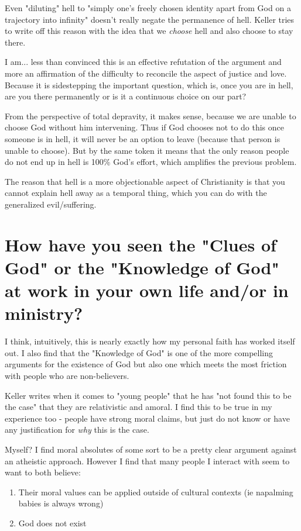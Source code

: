 \documentclass[12pt]{turabian-researchpaper}
\begin{document}
Even "diluting" hell to "simply one's freely chosen identity apart from God on a trajectory into infinity"\autocite[pg.80]{keller2008reason} doesn't really negate the permanence of hell. Keller tries to write off this reason with the idea that we \textit{choose} hell and also choose to stay there. 

I am... less than convinced this is an effective refutation of the argument and more an affirmation of the difficulty to reconcile the aspect of justice and love. Because it is sidestepping the important question, which is, once you are in hell, are you there permanently or is it a continuous choice on our part?

From the perspective of total depravity, it makes sense, because we are unable to choose God without him intervening. Thus if God chooses not to do this once someone is in hell, it will never be an option to leave (because that person is unable to choose). But by the same token it means that the only reason people do not end up in hell is 100\% God's effort, which amplifies the previous problem.

The reason that hell is a more objectionable aspect of Christianity is that you cannot explain hell away as a temporal thing, which you can do with the generalized evil/suffering. 

\section{How have you seen the "Clues of God" or the "Knowledge of God" at work in your own life and/or in ministry?}

I think, intuitively, this is nearly exactly how my personal faith has worked itself out. I also find that the "Knowledge of God" is one of the more compelling arguments for the existence of God but also one which meets the most friction with people who are non-believers.

Keller writes when it comes to "young people" that he has "not found this to be the case" that they are relativistic and amoral\autocite[pg.149]{keller2008reason}. I find this to be true in my experience too - people have strong moral claims, but just do not know or have any justification for \textit{why} this is the case.

Myself? I find moral absolutes of some sort to be a pretty clear argument against an atheistic approach. However I find that many people I interact with seem to want to both believe:

\begin{enumerate}
\item Their moral values can be applied outside of cultural contexts (ie napalming babies is always wrong)
\item God does not exist
\end{enumerate}
\end{document}
